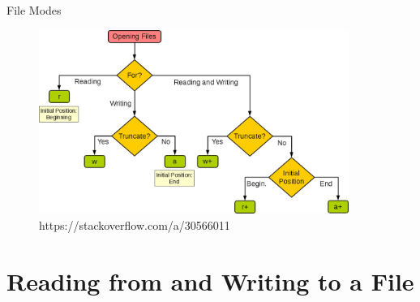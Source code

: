 \documentclass[
  american,
  ignorenonframetext,
]{beamer}
\begin{document}
\begin{frame}{File Modes}
\protect\hypertarget{file-modes-1}{}

\begin{figure}
\centering
\includegraphics[width=0.9\textwidth,height=\textheight]{06_FileIO/read_write_mode.png}
\caption{https://stackoverflow.com/a/30566011}
\end{figure}


\end{frame}

\hypertarget{reading-from-and-writing-to-a-file}{%
\section{Reading from and Writing to a
File}\label{reading-from-and-writing-to-a-file}}
\end{document}
